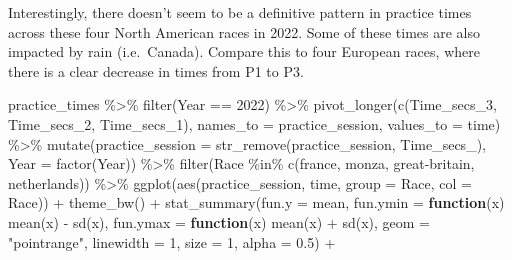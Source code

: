\documentclass[
]{book}
\newenvironment{Shaded}{\begin{snugshade}}{\end{snugshade}}
\newcommand{\AttributeTok}[1]{\textcolor[rgb]{0.77,0.63,0.00}{#1}}
\newcommand{\ControlFlowTok}[1]{\textcolor[rgb]{0.13,0.29,0.53}{\textbf{#1}}}
\newcommand{\DecValTok}[1]{\textcolor[rgb]{0.00,0.00,0.81}{#1}}
\newcommand{\FloatTok}[1]{\textcolor[rgb]{0.00,0.00,0.81}{#1}}
\newcommand{\FunctionTok}[1]{\textcolor[rgb]{0.00,0.00,0.00}{#1}}
\newcommand{\NormalTok}[1]{#1}
\newcommand{\SpecialCharTok}[1]{\textcolor[rgb]{0.00,0.00,0.00}{#1}}
\newcommand{\StringTok}[1]{\textcolor[rgb]{0.31,0.60,0.02}{#1}}
\begin{document}
Interestingly, there doesn't seem to be a definitive pattern in practice times across these four North American races in 2022. Some of these times are also impacted by rain (i.e.~Canada). Compare this to four European races, where there is a clear decrease in times from P1 to P3.

\begin{Shaded}
\begin{Highlighting}[]
\NormalTok{practice\_times }\SpecialCharTok{\%\textgreater{}\%}
  \FunctionTok{filter}\NormalTok{(Year }\SpecialCharTok{==} \DecValTok{2022}\NormalTok{) }\SpecialCharTok{\%\textgreater{}\%} 
  \FunctionTok{pivot\_longer}\NormalTok{(}\FunctionTok{c}\NormalTok{(Time\_secs\_3, Time\_secs\_2, Time\_secs\_1), }\AttributeTok{names\_to =} \StringTok{\textquotesingle{}practice\_session\textquotesingle{}}\NormalTok{, }\AttributeTok{values\_to =} \StringTok{\textquotesingle{}time\textquotesingle{}}\NormalTok{) }\SpecialCharTok{\%\textgreater{}\%}
  \FunctionTok{mutate}\NormalTok{(}\AttributeTok{practice\_session =} \FunctionTok{str\_remove}\NormalTok{(practice\_session, }\StringTok{\textquotesingle{}Time\_secs\_\textquotesingle{}}\NormalTok{),}
         \AttributeTok{Year =} \FunctionTok{factor}\NormalTok{(Year)) }\SpecialCharTok{\%\textgreater{}\%}
  \FunctionTok{filter}\NormalTok{(Race }\SpecialCharTok{\%in\%} \FunctionTok{c}\NormalTok{(}\StringTok{\textquotesingle{}france\textquotesingle{}}\NormalTok{, }\StringTok{\textquotesingle{}monza\textquotesingle{}}\NormalTok{, }\StringTok{\textquotesingle{}great{-}britain\textquotesingle{}}\NormalTok{, }\StringTok{\textquotesingle{}netherlands\textquotesingle{}}\NormalTok{)) }\SpecialCharTok{\%\textgreater{}\%} 
  \FunctionTok{ggplot}\NormalTok{(}\FunctionTok{aes}\NormalTok{(practice\_session, time, }
               \AttributeTok{group =}\NormalTok{ Race, }\AttributeTok{col =}\NormalTok{ Race)) }\SpecialCharTok{+}
  \FunctionTok{theme\_bw}\NormalTok{() }\SpecialCharTok{+}
  \FunctionTok{stat\_summary}\NormalTok{(}\AttributeTok{fun.y =}\NormalTok{ mean,}
               \AttributeTok{fun.ymin =} \ControlFlowTok{function}\NormalTok{(x) }\FunctionTok{mean}\NormalTok{(x) }\SpecialCharTok{{-}} \FunctionTok{sd}\NormalTok{(x), }
               \AttributeTok{fun.ymax =} \ControlFlowTok{function}\NormalTok{(x) }\FunctionTok{mean}\NormalTok{(x) }\SpecialCharTok{+} \FunctionTok{sd}\NormalTok{(x), }
               \AttributeTok{geom =} \StringTok{"pointrange"}\NormalTok{, }
               \AttributeTok{linewidth =} \DecValTok{1}\NormalTok{, }\AttributeTok{size =} \DecValTok{1}\NormalTok{, }\AttributeTok{alpha =} \FloatTok{0.5}\NormalTok{) }\SpecialCharTok{+}

\end{Highlighting}
\end{Shaded}
\end{document}
